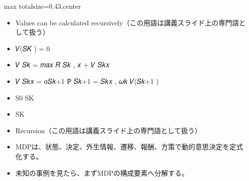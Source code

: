 \clearpage
{}
\begin{minipage}[t]{0.405\textwidth}
\begin{adjustbox}{max totalsize={\textwidth}{0.43\textheight},center}
\begin{minipage}{\textwidth}\scriptsize
{}\begin{itemize}
\item Values can be calculated recursively（この用語は講義スライド上の専門語として扱う）
\item 𝑉(𝑆𝐾 ) = 0
\item 𝑉 𝑆𝑘 = 𝑚𝑎𝑥 𝑅 𝑆𝑘 , 𝑥 + 𝑉 𝑆𝑘𝑥
\item 𝑉 𝑆𝑘𝑥 = σ𝑆𝑘+1 ℙ 𝑆𝑘+1 = 𝑆𝑘𝑥 , 𝜔𝑘 𝑉(𝑆𝑘+1 )
\item S0 SK
\item SK
\item Recursion（この用語は講義スライド上の専門語として扱う）
\end{itemize}\begin{itemize}
\item MDPは、状態、決定、外生情報、遷移、報酬、方策で動的意思決定を定式化する。
\item 未知の事例を見たら、まずMDPの構成要素へ分解する。
\end{itemize}
\end{minipage}
\end{adjustbox}
\end{minipage}\hfill
